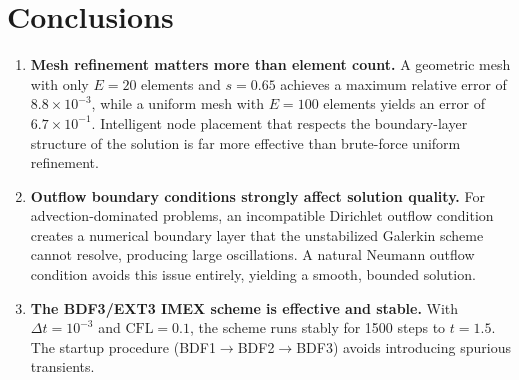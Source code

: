 \documentclass[11pt]{article}
\begin{document}
\section{Conclusions}

\begin{enumerate}
  \item \textbf{Mesh refinement matters more than element count.}
        A geometric mesh with only $E=20$ elements and $s=0.65$ achieves
        a maximum relative error of $8.8\times10^{-3}$, while a uniform
        mesh with $E=100$ elements yields an error of $6.7\times10^{-1}$.
        Intelligent node placement that respects the boundary-layer
        structure of the solution is far more effective than brute-force
        uniform refinement.

  \item \textbf{Outflow boundary conditions strongly affect solution quality.}
        For advection-dominated problems, an incompatible Dirichlet outflow
        condition creates a numerical boundary layer that the unstabilized
        Galerkin scheme cannot resolve, producing large oscillations.
        A natural Neumann outflow condition avoids this issue entirely,
        yielding a smooth, bounded solution.

  \item \textbf{The BDF3/EXT3 IMEX scheme is effective and stable.}
        With $\Delta t=10^{-3}$ and $\text{CFL}=0.1$, the scheme
        runs stably for 1500 steps to $t=1.5$.  The startup procedure
        (BDF1$\to$BDF2$\to$BDF3) avoids introducing spurious transients.
\end{enumerate}
\end{document}

